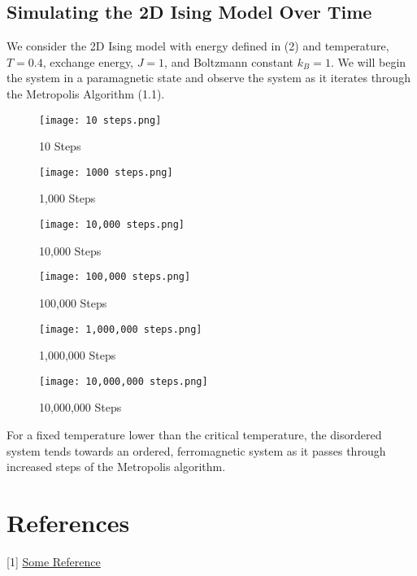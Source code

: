 \documentclass[a4paper]{article}
\begin{document}
\subsection{Simulating the 2D Ising Model Over Time}

We consider the 2D Ising model with energy defined in (2) and temperature, $T = 0.4$, exchange energy, $J = 1$, and Boltzmann constant $k_{B} = 1$. We will begin the system in a paramagnetic state and observe the system as it iterates through the Metropolis Algorithm (1.1).

\begin{figure}[!htb]
  \texttt{[image: 10 steps.png]}
  \caption{10 Steps}\label{fig:10steps}
\endminipage\hfill
{}
  \texttt{[image: 1000 steps.png]}
  \caption{1,000 Steps}\label{fig:100steps}
\endminipage\hfill
{}%
  \texttt{[image: 10,000 steps.png]}
  \caption{10,000 Steps}\label{fig:1000steps}
\endminipage
\end{figure}

\begin{figure}[!htb]
  \texttt{[image: 100,000 steps.png]}
  \caption{100,000 Steps}\label{fig:10steps}
\endminipage\hfill
{}
  \texttt{[image: 1,000,000 steps.png]}
  \caption{1,000,000 Steps}\label{fig:100steps}
\endminipage\hfill
{}%
  \texttt{[image: 10,000,000 steps.png]}
  \caption{10,000,000 Steps}\label{fig:1000steps}
\endminipage
\end{figure}

For a fixed temperature lower than the critical temperature, the disordered system tends towards an ordered, ferromagnetic system as it passes through increased steps of the Metropolis algorithm. 









 

\section{References}
[1] \href{https://cds.cern.ch/record/2280218/files/cern-summer-student.pdf}{Some Reference}
\end{document}
